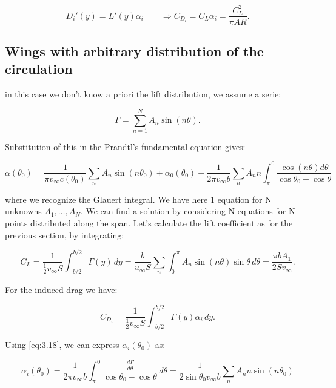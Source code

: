 	 \begin{equation}
	 D_i'(y) = L'(y) \alpha _i \qquad \Rightarrow C_{D_i} = C_L \alpha _i = \frac{C_L^2}{\pi AR}.
	 \end{equation}
	 
\subsection{Wings with arbitrary distribution of the circulation}
	in this case we don't know a priori the lift distribution, we assume a serie:
	
	\begin{equation}
	\Gamma = \sum _{n=1} ^N A_n \sin (n\theta).
	\end{equation}
	
	Substitution of this in the Prandtl's fundamental equation gives:
	
	\begin{equation}
	\alpha (\theta _0) = \frac{1}{\pi v_\infty c(\theta _0)} \sum _n A_n \sin (n\theta_0) + \alpha_0(\theta _0) + \frac{1}{2\pi v_\infty b} \sum _n A_n n \int ^0_\pi \frac{\cos (n\theta)d\theta}{\cos \theta _0 - \cos \theta}
	\label{eq:3.32}
	\end{equation}
	
	where we recognize the Glauert integral. We have here 1 equation for N unknowns $A_1, \dots, A_N$. We can find a solution by considering N equations for N points distributed along the span. Let's calculate the lift coefficient as for the previous section, by integrating:
	
	\begin{equation}
	C_L = \frac{1}{\frac{1}{2}v_\infty S} \int _{-b/2}^{b/2} \Gamma (y) \, dy = \frac{b}{u_\infty S} \sum _n \int _0 ^\pi A_n \sin (n\theta) \sin \theta \, d\theta = \frac{\pi b A_1}{2Sv_\infty}. 
	\end{equation}
	
	For the induced drag we have: 
	
	\begin{equation}
	C_{D_i} = \frac{1}{\frac{1}{2} v_\infty S} \int _{-b/2} ^{b/2} \Gamma (y)\alpha _i \, dy. 
	\end{equation}
	
	Using \eqref{eq:3.18}, we can express $\alpha _i (\theta _0)$ as:
	
	\begin{equation}
	\alpha _i (\theta _0) = \frac{1}{2\pi v_\infty b} \int ^{0}_{\pi} \frac{\frac{d\Gamma }{d\theta}}{\cos \theta _0 - \cos \theta} \, d\theta = \frac{1}{2\sin \theta _0 v_\infty b} \sum _n A_n n \sin (n \theta _0)
	\end{equation}
	
